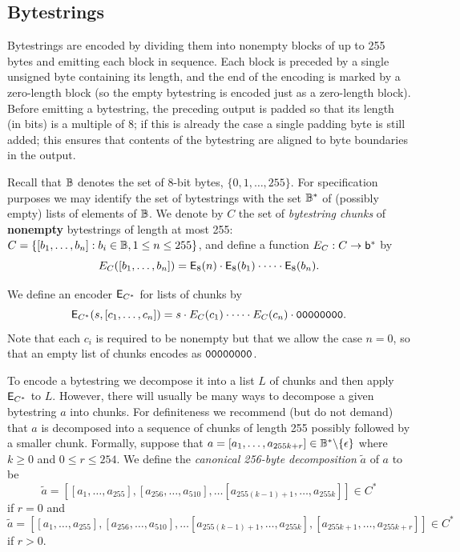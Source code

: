 \subsection{Bytestrings}  Bytestrings are encoded by dividing them into
nonempty blocks of up to 255 bytes and emitting each block in sequence.  Each
block is preceded by a single unsigned byte containing its length, and the end
of the encoding is marked by a zero-length block (so the empty bytestring is
encoded just as a zero-length block).  Before emitting a bytestring, the
preceding output is padded so that its length (in bits) is a multiple of 8; if
this is already the case a single padding byte is still added; this ensures that
contents of the bytestring are aligned to byte boundaries in the output.

Recall that $\mathbb{B}$ denotes the set of 8-bit bytes, $\{0,1, \ldots, 255\}$. For
specification purposes we may identify the set of bytestrings with the set
$\mathbb{B}^*$ of (possibly empty) lists of elements of $\mathbb{B}$.  We denote by $C$ the set
of \textit{bytestring chunks} of \textbf{nonempty} bytestrings of length at most
255: $C = \{[b_1, \ldots, b_n]: b_i \in \mathbb{B}, 1 \leq n \leq 255\}$, and define a
function $E_C: C \rightarrow \mathsf{b}^*$ by
$$
E_C ([b_1, \ldots, b_n]) = \mathsf{E}_8(n) \cdot \mathsf{E}_8(b_1) \cdot \cdots \cdot \mathsf{E}_8(b_n).
$$

\noindent
We define an encoder $\mathsf{E}_{C^*}$ for lists of chunks by
$$
\mathsf{E}_{C^*} (s, [c_1, \ldots, c_n]) = s \cdot E_C(c_1) \cdot \cdots \cdot E_C(c_n) \cdot \mathtt{00000000}.
$$
\noindent Note that each $c_i$ is required to be nonempty but that we allow the
case $n = 0$, so that an empty list of chunks encodes as $\mathtt{00000000}$.

\medskip
\noindent To encode a bytestring we decompose it into a list $L$ of chunks and
then apply $\mathsf{E}_{C^*}$ to $L$.  However, there will usually be many ways to
decompose a given bytestring $a$ into chunks. For definiteness we recommend (but
do not demand) that $a$ is decomposed into a sequence of chunks of length 255
possibly followed by a smaller chunk.  Formally, suppose that $a = [a_1, \ldots,
  a_{255k+r}] \in \mathbb{B}^*\backslash\{\epsilon\}$ where $k \geq 0$ and $0 \leq r
\leq 254$.  We define the \textit{canonical 256-byte decomposition} $\tilde{a}$ of $a$ to
be
$$
\tilde{a} = [[a_1, \ldots, a_{255}],
  [a_{256}, \ldots, a_{510}],\ldots
  [a_{255(k-1)+1}, \ldots, a_{255k}]] \in C^*
$$
\noindent if $r=0$ and
$$
\tilde{a} = [[a_1, \ldots, a_{255}],
  [a_{256}, \ldots, a_{510}],\ldots
  [a_{255(k-1)+1}, \ldots, a_{255k}], [a_{255k+1}, \ldots, a_{255k+r}]] \in C^*
$$
\noindent if $r>0$.

